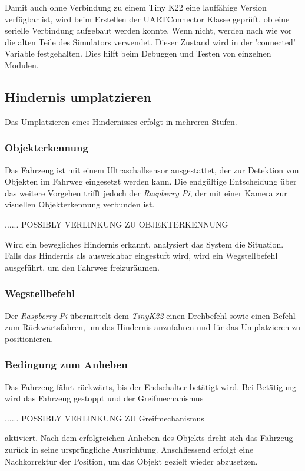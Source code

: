 Damit auch ohne Verbindung zu einem Tiny K22 eine lauffähige Version verfügbar ist, wird beim Erstellen der UARTConnector Klasse geprüft, ob eine serielle Verbindung aufgebaut werden konnte. Wenn nicht, werden nach wie vor die alten Teile des Simulators verwendet. Dieser Zustand wird in der 'connected' Variable festgehalten. Dies hilft beim Debuggen und Testen von einzelnen Modulen.


\newpage
\subsection{Hindernis umplatzieren}

Das Umplatzieren eines Hindernisses erfolgt in mehreren Stufen.

\subsubsection{Objekterkennung}
Das Fahrzeug ist mit einem Ultraschallsensor ausgestattet, der zur Detektion von Objekten im Fahrweg eingesetzt werden kann. Die endgültige Entscheidung über das weitere Vorgehen trifft jedoch der \textit{Raspberry Pi}, der mit einer Kamera zur visuellen Objekterkennung verbunden ist.

...... POSSIBLY VERLINKUNG ZU OBJEKTERKENNUNG

Wird ein bewegliches Hindernis erkannt, analysiert das System die Situation. Falls das Hindernis als ausweichbar eingestuft wird, wird ein Wegstellbefehl ausgeführt, um den Fahrweg freizuräumen.

\subsubsection{Wegstellbefehl}
Der \textit{Raspberry Pi} übermittelt dem \textit{TinyK22} einen Drehbefehl sowie einen Befehl zum Rückwärtsfahren, um das Hindernis anzufahren und für das Umplatzieren zu positionieren.

\subsubsection{Bedingung zum Anheben}
Das Fahrzeug fährt rückwärts, bis der Endschalter betätigt wird. Bei Betätigung wird das Fahrzeug gestoppt und der Greifmechanismus

...... POSSIBLY VERLINKUNG ZU Greifmechanismus

aktiviert. Nach dem erfolgreichen Anheben des Objekts dreht sich das Fahrzeug zurück in seine ursprüngliche Ausrichtung. Anschliessend erfolgt eine Nachkorrektur der Position, um das Objekt gezielt wieder abzusetzen.

